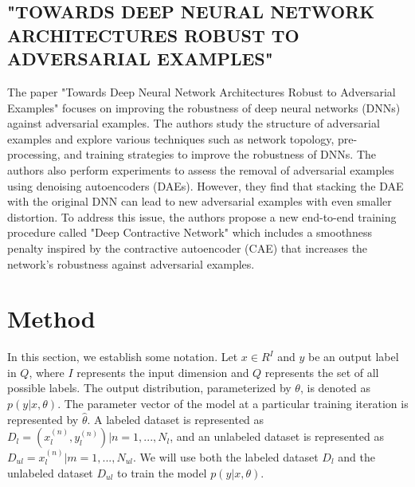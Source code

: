 \documentclass[paper=a4, fontsize=11pt]{scrartcl}
\numberwithin{equation}{section}		%
\numberwithin{figure}{section}			%
\numberwithin{table}{section}				%
\begin{document}
\subsection{"TOWARDS DEEP NEURAL NETWORK ARCHITECTURES ROBUST TO ADVERSARIAL EXAMPLES"\cite{Towards deep neural network architectures robust to adversarial example}}
The paper "Towards Deep Neural Network Architectures Robust to Adversarial Examples" focuses on improving the robustness of deep neural networks (DNNs) against adversarial examples. The authors study the structure of adversarial examples and explore various techniques such as network topology, pre-processing, and training strategies to improve the robustness of DNNs. The authors also perform experiments to assess the removal of adversarial examples using denoising autoencoders (DAEs). However, they find that stacking the DAE with the original DNN can lead to new adversarial examples with even smaller distortion. To address this issue, the authors propose a new end-to-end training procedure called "Deep Contractive Network" which includes a smoothness penalty inspired by the contractive autoencoder (CAE) that increases the network's robustness against adversarial examples.

\section{Method}
In this section, we establish some notation. Let $x \in R^I$ and $y$ be an output label in $Q$, where $I$ represents the input dimension and $Q$ represents the set of all possible labels. The output distribution, parameterized by $\theta$, is denoted as $p(y|x, \theta)$. The parameter vector of the model at a particular training iteration is represented by $\hat{\theta}$. A labeled dataset is represented as $D_l = {(x_l^{(n)}, y_l^{(n)})|n = 1, ..., N_l}$, and an unlabeled dataset is represented as $D_{ul} = {x_l^{(n)} |m = 1, ..., N_{ul}}$. We will use both the labeled dataset $D_l$ and the unlabeled dataset  $D_{ul}$ to train the model $p(y|x, \theta)$.
\end{document}
